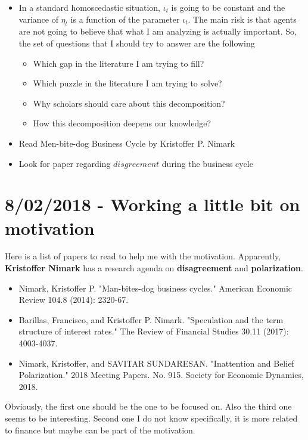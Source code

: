 \documentclass{article}
\begin{document}
{\begin{itemize}
	\item In a standard homoscedastic situation, $\iota_t$ is going to be constant and the variance of $\eta_t$ is a function of the parameter $\iota_t$. The main risk is that agents are not going to believe that what I am analyzing is actually important. So, the set of questions that I should try to answer are the following
	\begin{itemize}
		\item Which gap in the literature I am trying to fill?
		\item Which puzzle in the literature I am trying to solve?
		\item Why scholars should care about this decomposition?
		\item How this decomposition deepens our knowledge? 
	\end{itemize} 
\item Read Men-bite-dog Business Cycle by Kristoffer P. Nimark

\item Look for paper regarding $disgreement$ during the business cycle
\end{itemize}


\section*{8/02/2018 - Working a little bit on motivation}

Here is a list of papers to read to help me with the motivation. Apparently, \textbf{Kristoffer Nimark} has a research agenda on \textbf{disagreement} and \textbf{polarization}.

\begin{itemize}
	\item Nimark, Kristoffer P. "Man-bites-dog business cycles." American Economic Review 104.8 (2014): 2320-67.
	
	\item Barillas, Francisco, and Kristoffer P. Nimark. "Speculation and the term structure of interest rates." The Review of Financial Studies 30.11 (2017): 4003-4037.
	
	\item Nimark, Kristoffer, and SAVITAR SUNDARESAN. "Inattention and Belief Polarization." 2018 Meeting Papers. No. 915. Society for Economic Dynamics, 2018.
\end{itemize}

Obviously, the first one should be the one to be focused on. Also the third one seems to be interesting. Second one I do not know specifically, it is more related to finance but maybe can be part of the motivation.

}
\end{document}
